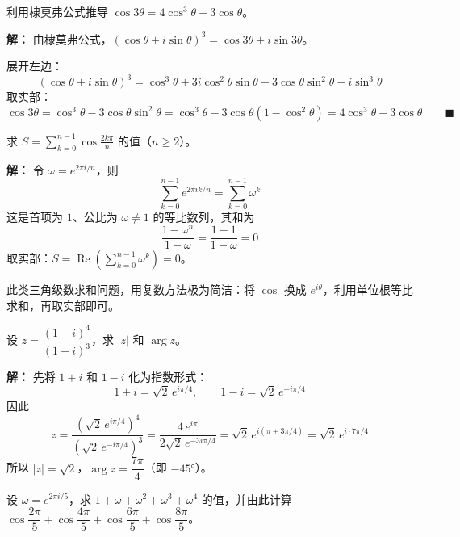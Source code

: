 \documentclass[12pt, a4paper]{ctexart}
\begin{document}
\begin{examplebox}
利用棣莫弗公式推导 $\cos 3\theta = 4\cos^3\theta - 3\cos\theta$。
\end{examplebox}

\textbf{解：}
由棣莫弗公式，$(\cos\theta+i\sin\theta)^3 = \cos 3\theta+i\sin 3\theta$。

展开左边：
\[
  (\cos\theta+i\sin\theta)^3 = \cos^3\theta + 3i\cos^2\theta\sin\theta - 3\cos\theta\sin^2\theta - i\sin^3\theta
\]
取实部：
\[
  \cos 3\theta = \cos^3\theta - 3\cos\theta\sin^2\theta
  = \cos^3\theta - 3\cos\theta(1-\cos^2\theta)
  = 4\cos^3\theta - 3\cos\theta \qquad\blacksquare
\]

\begin{examplebox}[【例题3】用复数求三角级数和]
求 $\displaystyle S = \sum_{k=0}^{n-1}\cos\frac{2k\pi}{n}$ 的值（$n\geq 2$）。
\end{examplebox}

\textbf{解：}
令 $\omega = e^{2\pi i/n}$，则
\[
  \sum_{k=0}^{n-1}e^{2\pi ik/n} = \sum_{k=0}^{n-1}\omega^k
\]
这是首项为 $1$、公比为 $\omega\neq 1$ 的等比数列，其和为
\[
  \frac{1-\omega^n}{1-\omega} = \frac{1-1}{1-\omega} = 0
\]
取实部：$\displaystyle S = \operatorname{Re}\left(\sum_{k=0}^{n-1}\omega^k\right) = \boxed{0}$。

\begin{tipbox}[方法总结]
此类三角级数求和问题，用复数方法极为简洁：将 $\cos$ 换成 $e^{i\theta}$，利用单位根等比求和，再取实部即可。
\end{tipbox}

\begin{examplebox}[【例题4】复数的模与辐角]
设 $z = \dfrac{(1+i)^4}{(1-i)^3}$，求 $|z|$ 和 $\arg z$。
\end{examplebox}

\textbf{解：}
先将 $1+i$ 和 $1-i$ 化为指数形式：
\[
  1+i = \sqrt{2}\,e^{i\pi/4}, \qquad 1-i = \sqrt{2}\,e^{-i\pi/4}
\]
因此
\[
  z = \frac{(\sqrt{2}\,e^{i\pi/4})^4}{(\sqrt{2}\,e^{-i\pi/4})^3}
  = \frac{4\,e^{i\pi}}{2\sqrt{2}\,e^{-3i\pi/4}}
  = \sqrt{2}\,e^{i(\pi+3\pi/4)}
  = \sqrt{2}\,e^{i\cdot 7\pi/4}
\]
所以 $|z|=\boxed{\sqrt{2}}$，$\arg z = \boxed{\dfrac{7\pi}{4}}$（即 $-45°$）。

\begin{examplebox}[【例题5】单位根求值]
设 $\omega = e^{2\pi i/5}$，求 $1+\omega+\omega^2+\omega^3+\omega^4$ 的值，并由此计算 $\cos\dfrac{2\pi}{5}+\cos\dfrac{4\pi}{5}+\cos\dfrac{6\pi}{5}+\cos\dfrac{8\pi}{5}$。
\end{examplebox}
\end{document}

